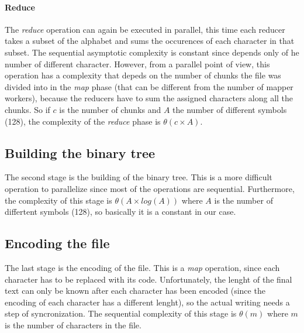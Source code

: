 \documentclass[12pt, letterpaper]{article}  %
\begin{document}
\paragraph*{Reduce}
The \textit{reduce} operation can again be executed in parallel, this 
time each reducer takes a subset of the alphabet and sums the occurences of each character in that subset. The sequential
asymptotic complexity is constant since depends only of he number of different character. However, from a parallel point of view, this operation 
has a complexity that depeds on the number of chunks the file was divided into in the \textit{map} phase (that can be different from the number of
mapper workers), because the reducers have to sum the assigned characters along all the chunks. So if $c$ is the number of chunks and $A$ the number
of different symbols (128), the complexity of the \textit{reduce} phase is $\theta(c \times A)$.

\subsection{Building the binary tree}
The second stage is the building of the binary tree. This is a more difficult operation to parallelize since 
most of the operations are sequential. Furthermore, the complexity of this stage is $\theta(A \times log (A))$  where 
$A$ is the number of differtent symbols (128), so basically it is a constant in our case.

\subsection{Encoding the file}
The last stage is the encoding of the file. This is a \textit{map} operation, since each character has to be replaced with its code.
Unfortunately, the lenght of the final text can only be known after each character has been encoded (since the encoding of each character
has a different lenght), so the actual writing needs a step of syncronization. The sequential complexity of this stage is $\theta(m)$ where $m$ is 
the number of characters in the file.


\FloatBarrier

\newpage \FloatBarrier


\end{document}
